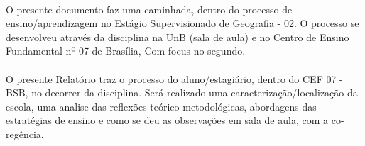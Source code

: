 \hspace{1.5cm}
\paragraph{}O presente documento faz uma caminhada, dentro do processo de ensino/aprendizagem no Estágio Supervisionado de Geografia - 02. O processo se desenvolveu através da disciplina na UnB (sala de aula) e no Centro de Ensino Fundamental nº 07 de Brasília, Com focus no segundo.
\paragraph{}O presente Relatório traz o processo do aluno/estagiário, dentro do CEF 07 - BSB, no decorrer da disciplina. Será realizado uma caracterização/localização da escola, uma analise das reflexões teórico metodológicas, abordagens das estratégias de ensino e como se deu as observações em sala de aula, com a co-regência. 